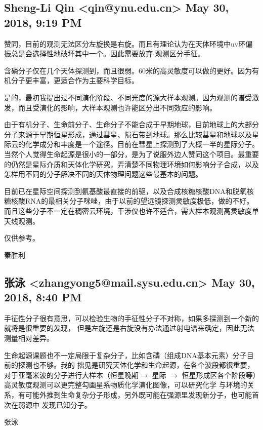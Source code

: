 \documentclass{article}
\newcommand\from[2]{\subsection{{#1} {#2}}}
\newcommand\said[1]{#1}
\begin{document}
\from{
Sheng-Li Qin <qin@ynu.edu.cn>
}
{
May 30, 2018, 9:19 PM
}
\said{
赞同，目前的观测无法区分左旋换是右旋。而且有理论认为在天体环境中uv环偏振总是会选择性地破坏其中一个。因此需要放弃
观测区分手征。

含磷分子仅在几个天体探测到，而且很弱。60米的高灵敏度可以做的更好。因为有机分子更丰富，更适合作为主要科学目标。

是的，最初我提出过不同演化阶段、不同光度的源大样本观测。因为观测的谱受激发，而且受演化的影响，大样本观测也许能区分出不同效应的影响。

由于有机分子、生命前分子、生命分子不能合成于早期地球，目前地球上的大部分分子来源于早期恒星形成，通过彗星、陨石带到地球。那么比较彗星和地球以及星际云的化学成分和丰度是一个途径。目前在彗星上探测到了大概一半的星际分子。当然个人觉得生命起源是很小的一部分，是为了说服外边人赞同这个项目。最重要的仍然是星际介质和天体化学研究，弄清楚不同物理环境如何影响分子合成，以及怎样用不同的分子解决不同的天体物理问题这些最基本的问题。

目前已在星际空间探测到氨基酸最直接的前驱，以及合成核糖核酸DNA和脱氧核糖核酸RNA的最相关分子咪唑，由于以前的望远镜探测灵敏度极低，做的不好。而且这些分子不一定在稠密云环境，干涉仪也许不适合，需大样本观测高灵敏度单天线观测。

仅供参考。

秦胜利
}

\from{
张泳 <zhangyong5@mail.sysu.edu.cn>
}{
May 30, 2018, 8:40 PM
}
\said{
手征性分子很有意思，可以检验生物的手征性分子不对称，如果多探测到一个新的就将是很重要的发现，
但是左旋还是右旋没有办法通过射电谱来确定，因此无法测量相对差异。

生命起源课题也不一定局限于复杂分子，比如含磷（组成DNA基本元素）分子目前的探测也不够。我的
拙见是研究天体化学和生命起源，在各个波段都很重要，对于亚毫米波的分子进行大样本（恒星晚期$\rightarrow$
星际 $\rightarrow$ 恒星形成区各个阶段等）高灵敏度观测可以更完整勾画星系物质化学演化图像，可以研究化学
与环境的关系，有可能外推到生命复杂分子形成，另外既可能在强源里发现新分子，也可能首次在弱源中
发现已知分子。

张泳
}
\end{document}
